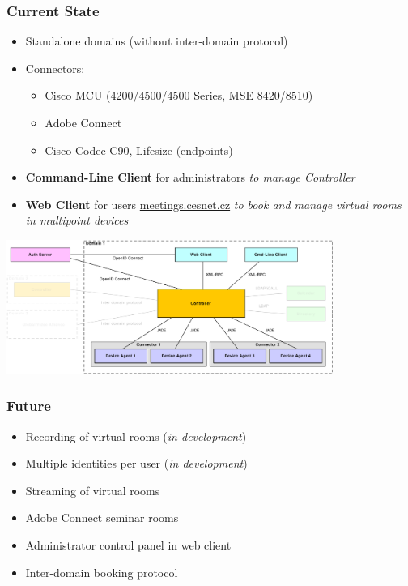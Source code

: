 \documentclass{beamer}
\begin{document}
\begin{frame}
  \frametitle{Current State}
  \begin{itemize}
    \item Standalone domains (without inter-domain protocol)
    \item Connectors:
    \begin{itemize}
      \item Cisco MCU (4200/4500/4500 Series, MSE 8420/8510)
      \item Adobe Connect
      \item Cisco Codec C90, Lifesize (endpoints)
    \end{itemize}
    \item\textbf{Command-Line Client} for administrators
    \newline\textit{to manage Controller}
    \item\textbf{Web Client} for users \hfill\url{meetings.cesnet.cz}
    \newline\textit{to book and manage virtual rooms in multipoint devices}
  \end{itemize}
  \begin{center}
  \includegraphics[width=0.8\textwidth]{../architecture/diagrams/dd_architecture_implemented.pdf}
  \end{center}
\end{frame}

\begin{frame}
  \frametitle{Future}
  \begin{itemize}
    \item Recording of virtual rooms (\textit{in development})
    \item Multiple identities per user (\textit{in development})
    \item Streaming of virtual rooms
    \item Adobe Connect seminar rooms
    \item Administrator control panel in web client
    \item Inter-domain booking protocol
  \end{itemize}
\end{frame}
\end{document}
